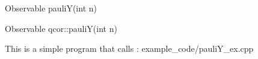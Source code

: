 
\begin{apidefinition}

\begin{Csynopsis}
    Observable pauliY(int n)
\end{Csynopsis}

\begin{Cppsynopsis}
    Observable qcor::pauliY(int n)
\end{Cppsynopsis}


\begin{apiarguments}
\end{apiarguments}



\apinotes{
    
}

\begin{apiexamples}

\apicppexample
    { This is a simple program that calls : } 
    { example_code/pauliY_ex.cpp} 
    {}

\end{apiexamples}

\end{apidefinition}
